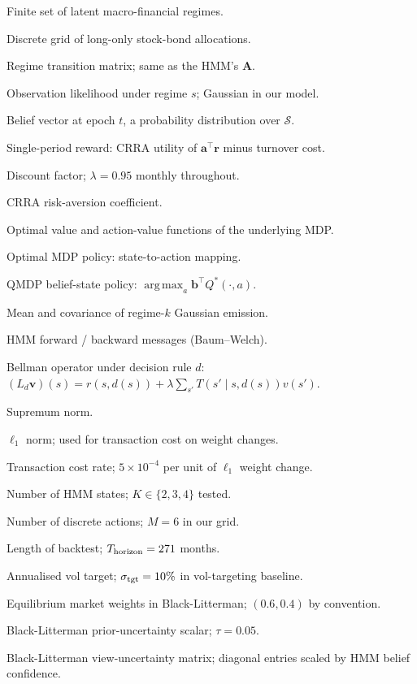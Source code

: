 \documentclass[11pt]{article}
\theoremstyle{plain1}
\theoremstyle{definition1}
\newcommand{\argmax}{\operatorname*{arg\,max}}
\newcommand{\1}{\mathbf{1}}
\newcommand{\bel}{\mathbf{b}}
\newcommand{\state}{\mathcal{S}}
\newcommand{\action}{\mathcal{A}}
\begin{document}
\begin{description}[itemsep=2pt,topsep=4pt,labelwidth=2.5cm,leftmargin=2.7cm]
  \item[$\state$] Finite set of latent macro-financial regimes.
  \item[$\action$] Discrete grid of long-only stock-bond allocations.
  \item[$T(s' \mid s)$] Regime transition matrix; same as the HMM's $\mathbf{A}$.
  \item[$O(\mathbf{o} \mid s)$] Observation likelihood under regime $s$; Gaussian in our model.
  \item[$\bel_t$] Belief vector at epoch $t$, a probability distribution over $\state$.
  \item[$R(s, \mathbf{a})$] Single-period reward: CRRA utility of $\mathbf{a}^\top \mathbf{r}$ minus turnover cost.
  \item[$\lambda$] Discount factor; $\lambda = 0.95$ monthly throughout.
  \item[$\gamma$] CRRA risk-aversion coefficient.
  \item[$V^\ast, Q^\ast$] Optimal value and action-value functions of the underlying MDP.
  \item[$\pi^\ast(s)$] Optimal MDP policy: state-to-action mapping.
  \item[$\pi_{\rm QMDP}(\bel)$] QMDP belief-state policy: $\argmax_a \bel^\top Q^\ast(\cdot, a)$.
  \item[$\mu_k, \Sigma_k$] Mean and covariance of regime-$k$ Gaussian emission.
  \item[$\boldsymbol{\alpha}_t, \boldsymbol{\beta}_t$] HMM forward / backward messages (Baum--Welch).
  \item[$L_d$] Bellman operator under decision rule $d$: $(L_d \mathbf{v})(s) = r(s,d(s)) + \lambda \sum_{s'} T(s' \mid s, d(s)) v(s')$.
  \item[$\| \cdot \|_\infty$] Supremum norm.
  \item[$\| \cdot \|_1$] $\ell_1$ norm; used for transaction cost on weight changes.
  \item[$c$] Transaction cost rate; $5 \times 10^{-4}$ per unit of $\ell_1$ weight change.
  \item[$K$] Number of HMM states; $K \in \{2, 3, 4\}$ tested.
  \item[$M$] Number of discrete actions; $M = 6$ in our grid.
  \item[$T_{\rm horizon}$] Length of backtest; $T_{\rm horizon} = 271$ months.
  \item[$\sigma_{\rm tgt}$] Annualised vol target; $\sigma_{\rm tgt} = 10\%$ in vol-targeting baseline.
  \item[$w_{\rm mkt}$] Equilibrium market weights in Black-Litterman; $(0.6, 0.4)$ by convention.
  \item[$\tau$] Black-Litterman prior-uncertainty scalar; $\tau = 0.05$.
  \item[$\Omega$] Black-Litterman view-uncertainty matrix; diagonal entries scaled by HMM belief confidence.
\end{description}
\end{document}
